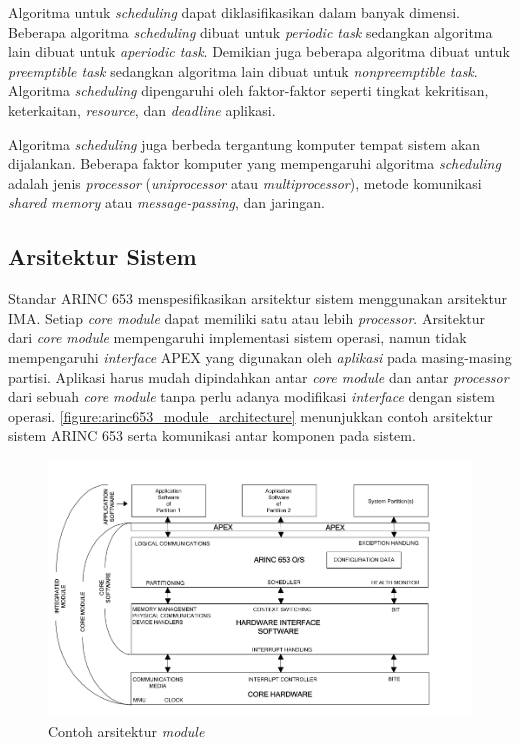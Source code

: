 Algoritma untuk \textit{scheduling} dapat diklasifikasikan dalam banyak dimensi.
Beberapa algoritma \textit{scheduling} dibuat untuk \textit{periodic task} sedangkan algoritma lain dibuat untuk \textit{aperiodic task}.
Demikian juga beberapa algoritma dibuat untuk \textit{preemptible task} sedangkan algoritma lain dibuat untuk \textit{nonpreemptible task}.
Algoritma \textit{scheduling} dipengaruhi oleh faktor-faktor seperti tingkat kekritisan, keterkaitan, \textit{resource}, dan \textit{deadline} aplikasi.

Algoritma \textit{scheduling} juga berbeda tergantung komputer tempat sistem akan dijalankan.
Beberapa faktor komputer yang mempengaruhi algoritma \textit{scheduling} adalah jenis \textit{processor} (\textit{uniprocessor} atau \textit{multiprocessor}), metode komunikasi \textit{shared memory} atau \textit{message-passing}, dan jaringan.

\subsection{Arsitektur Sistem}

Standar ARINC 653 menspesifikasikan arsitektur sistem menggunakan arsitektur IMA.
Setiap \textit{core module} dapat memiliki satu atau lebih \textit{processor}. Arsitektur dari \textit{core module} mempengaruhi implementasi sistem operasi, namun tidak mempengaruhi \textit{interface} APEX yang digunakan oleh \textit{aplikasi} pada masing-masing partisi.
Aplikasi harus mudah dipindahkan antar \textit{core module} dan antar \textit{processor} dari sebuah \textit{core module} tanpa perlu adanya modifikasi \textit{interface} dengan sistem operasi.
\autoref{figure:arinc653_module_architecture} menunjukkan contoh arsitektur sistem ARINC 653 serta komunikasi antar komponen pada sistem.

\begin{figure}[htbp]
    \centering
    \includegraphics[scale=0.4]{resources/arinc653-architecture.png}
    \caption[Contoh arsitektur \textit{module}]{Contoh arsitektur \textit{module} \citep{AirlinesElectronicEngineeringCommittee2012}}
    \label{figure:arinc653_module_architecture}
\end{figure}

